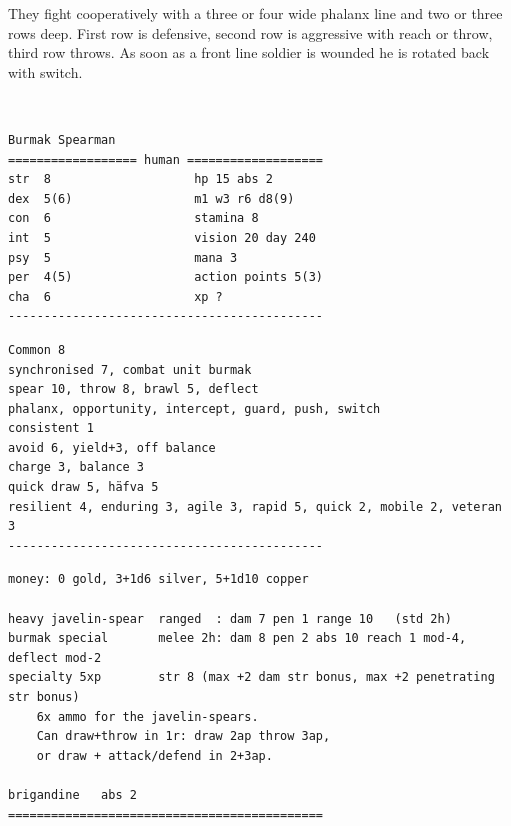 They fight cooperatively with a three or four wide phalanx line and two or three rows deep. First row is defensive, second row is aggressive with reach or throw, third row throws. As soon as a front line soldier is wounded he is rotated back with switch.

\

\goodbreak \small \begin{samepage} \begin{verbatim}
Burmak Spearman
================== human ===================
str  8                    hp 15 abs 2
dex  5(6)                 m1 w3 r6 d8(9)
con  6                    stamina 8
int  5                    vision 20 day 240
psy  5                    mana 3
per  4(5)                 action points 5(3)
cha  6                    xp ?
--------------------------------------------
\end{verbatim} \end{samepage} \goodbreak \begin{samepage} \begin{verbatim}
Common 8
synchronised 7, combat unit burmak
spear 10, throw 8, brawl 5, deflect
phalanx, opportunity, intercept, guard, push, switch
consistent 1
avoid 6, yield+3, off balance
charge 3, balance 3
quick draw 5, häfva 5
resilient 4, enduring 3, agile 3, rapid 5, quick 2, mobile 2, veteran 3
--------------------------------------------
\end{verbatim} \end{samepage} \goodbreak \begin{samepage} \begin{verbatim}
money: 0 gold, 3+1d6 silver, 5+1d10 copper

heavy javelin-spear  ranged  : dam 7 pen 1 range 10   (std 2h)
burmak special       melee 2h: dam 8 pen 2 abs 10 reach 1 mod-4, deflect mod-2
specialty 5xp        str 8 (max +2 dam str bonus, max +2 penetrating str bonus)
    6x ammo for the javelin-spears. 
    Can draw+throw in 1r: draw 2ap throw 3ap, 
    or draw + attack/defend in 2+3ap.
        
brigandine   abs 2
============================================
\end{verbatim} \end{samepage} \normalsize






























